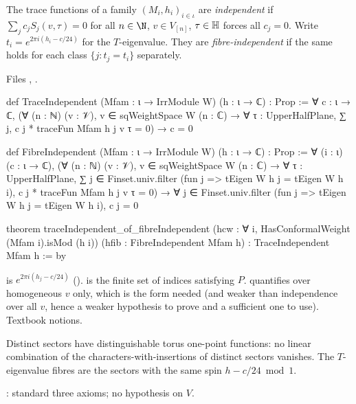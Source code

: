 \begin{definition}\label{l15:def:indep}
The trace functions of a family $(M_i,h_i)_{i\in\iota}$ are \emph{independent} if $\sum_jc_jS_j(v,\tau)=0$ for all
$n\in\N$, $v\in V_{[n]}$, $\tau\in\mathbb{H}$ forces all $c_j=0$. Write $t_i=e^{2\pi i(h_i-c/24)}$ for the $T$-eigenvalue. They
are \emph{fibre-independent} if the same holds for each class $\{j:t_j=t_i\}$ separately.
\end{definition}
\noindent Files ,
.
\begin{leancode}
def TraceIndependent (Mfam : ι → IrrModule W) (h : ι → ℂ) : Prop :=
  ∀ c : ι → ℂ, (∀ (n : ℕ) (v : 𝒱), v ∈ sqWeightSpace W (n : ℂ) → ∀ τ : UpperHalfPlane,
    ∑ j, c j * traceFun Mfam h j v τ = 0) → c = 0

def FibreIndependent (Mfam : ι → IrrModule W) (h : ι → ℂ) : Prop :=
  ∀ (i : ι) (c : ι → ℂ),
    (∀ (n : ℕ) (v : 𝒱), v ∈ sqWeightSpace W (n : ℂ) → ∀ τ : UpperHalfPlane,
      ∑ j ∈ Finset.univ.filter (fun j => tEigen W h j = tEigen W h i),
        c j * traceFun Mfam h j v τ = 0) →
    ∀ j ∈ Finset.univ.filter (fun j => tEigen W h j = tEigen W h i), c j = 0

theorem traceIndependent_of_fibreIndependent (hcw : ∀ i, HasConformalWeight (Mfam i).isMod (h i))
    (hfib : FibreIndependent Mfam h) : TraceIndependent Mfam h := by
\end{leancode}

\begin{dictionary}
 is $e^{2\pi i(h_j-c/24)}$ ().  is the finite
set of indices satisfying $P$.  quantifies over homogeneous $v$ only, which is the form needed (and
weaker than independence over all $v$, hence a weaker hypothesis to prove and a sufficient one to use). Textbook notions.
\end{dictionary}

\begin{physics}
Distinct sectors have distinguishable torus one-point functions: no linear combination of the characters-with-insertions of
distinct sectors vanishes. The $T$-eigenvalue fibres are the sectors with the same spin $h-c/24 \bmod 1$.
\end{physics}

\begin{status}
\allowbreak{}: standard three axioms; no hypothesis on $V$.
\end{status}

